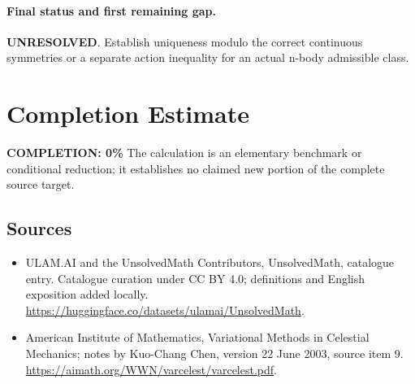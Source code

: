 \documentclass[11pt]{article}
\begin{document}
\paragraph{Final status and first remaining gap.}
\textbf{UNRESOLVED}. Establish uniqueness modulo the correct continuous symmetries or a separate action inequality for an actual n-body admissible class.

\section{Completion Estimate}
\noindent\textbf{COMPLETION: 0\%}
The calculation is an elementary benchmark or conditional reduction; it establishes no claimed new portion of the complete source target.

\subsection{Sources}
\begin{itemize}
\item[\hypertarget{source:statement:1}{S1}] ULAM.AI and the UnsolvedMath Contributors, UnsolvedMath, catalogue entry. Catalogue curation under CC BY 4.0; definitions and English exposition added locally.
\url{https://huggingface.co/datasets/ulamai/UnsolvedMath}.
\item[\hypertarget{source:statement:2}{S2}] American Institute of Mathematics, Variational Methods in Celestial Mechanics; notes by Kuo-Chang Chen, version 22 June 2003, source item 9.
\url{https://aimath.org/WWN/varcelest/varcelest.pdf}.
\end{itemize}
\label{end:statement}
\end{document}
